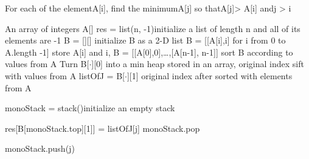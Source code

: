 \documentclass[paper=a4, fontsize=11pt]{scrartcl} %
\numberwithin{equation}{section} %
\numberwithin{figure}{section} %
\numberwithin{table}{section} %
\begin{document}
\begin{algorithm}
	\caption{For each of the elementA[i], find the minimumA[j] so thatA[j]> A[i] andj > i}
	\begin{algorithmic}[1]
		\Require An array of integers A[]
            \State res = list(n, -1)\Comment initialize a list of length n and all of its elements are -1
            \State B = [][] \Comment initialize B as a 2-D list
            \State B = [[A[i],i] for i from 0 to A.length -1] \Comment store A[i] and i, B = [[A[0],0],\dots,[A[n-1], n-1]]
            \State {}\Comment sort B according to values from A
            \State {} \Comment Turn B[$\cdot$][0] into a min heap stored in an array, original index sift with values from A
            \State listOfJ = B[$\cdot$][1] \Comment original index after sorted with elements from A


            \State monoStack = stack()\Comment initialize an empty stack
            
            \State res[B[monoStack.top][1]] = listOfJ[j]
            \State monoStack.pop

            \EndWhile
            \State monoStack.push(j)

            \EndFor
            \State {}


            
			
		\EndFunction
	\end{algorithmic}

\end{algorithm}
\end{document}

